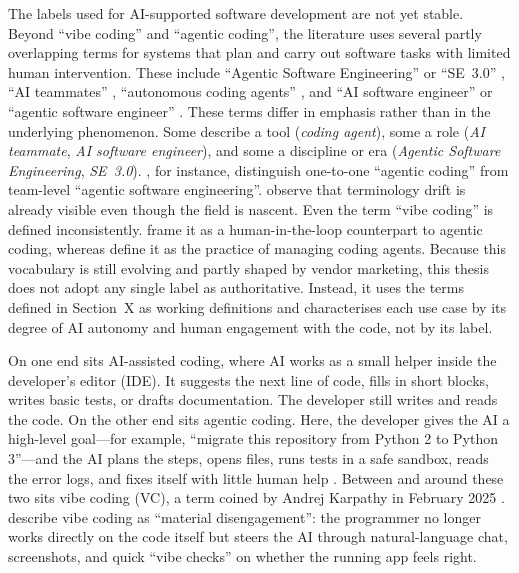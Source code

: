 \documentclass[10pt,a4paper]{article}
\begin{document}
The labels used for AI-supported software development are not yet stable.
Beyond \enquote{vibe coding} and \enquote{agentic coding}, the literature uses
several partly overlapping terms for systems that plan and carry out software
tasks with limited human intervention. These include \enquote{Agentic Software
Engineering} or \enquote{SE~3.0} \parencite{hassan2025}, \enquote{AI teammates}
\parencite{hassan2024, li2025teammates}, \enquote{autonomous coding agents} \parencite{li2025teammates},
and \enquote{AI software engineer} or \enquote{agentic software engineer}
\parencite{hoda2025}. These terms differ in emphasis rather than in the underlying
phenomenon. Some describe a tool (\emph{coding agent}), some a role
(\emph{AI teammate}, \emph{AI software engineer}), and some a discipline or era
(\emph{Agentic Software Engineering}, \emph{SE~3.0}). \textcite{hassan2025}, for
instance, distinguish one-to-one \enquote{agentic coding} from team-level
\enquote{agentic software engineering}. \textcite{hoda2025} observe that
terminology drift is already visible even though the field is nascent. Even the
term \enquote{vibe coding} is defined inconsistently. \textcite{sapkota2025} frame it
as a human-in-the-loop counterpart to agentic coding, whereas \textcite{ge2025}
define it as the practice of managing coding agents. Because this vocabulary is
still evolving and partly shaped by vendor marketing, this thesis does not adopt
any single label as authoritative. Instead, it uses the terms defined in
Section~X as working definitions and characterises each use case by its degree of
AI autonomy and human engagement with the code, not by its label.
 

On one end sits AI-assisted coding, where AI works as a small helper inside the developer's editor (IDE). It suggests the next line of code, fills in short blocks, writes basic tests, or drafts documentation. The developer still writes and reads the code. On the other end sits agentic coding. Here, the developer gives the AI a high-level goal---for example, ``migrate this repository from Python 2 to Python 3''---and the AI plans the steps, opens files, runs tests in a safe sandbox, reads the error logs, and fixes itself with little human help \parencite{sapkota2025,galster2026}. Between and around these two sits vibe coding (VC), a term coined by Andrej Karpathy in February 2025 \parencite{karpathy2025vibecoding}. \textcite{sarkar2025} describe vibe coding as ``material disengagement'': the programmer no longer works directly on the code itself but steers the AI through natural-language chat, screenshots, and quick ``vibe checks'' on whether the running app feels right.
\end{document}
